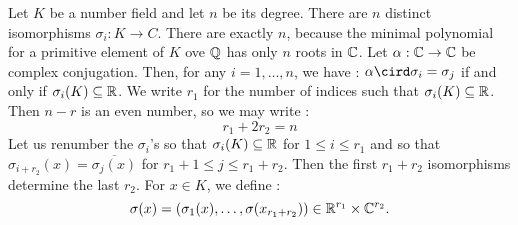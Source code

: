 Let $K$ be a number field and let $n$ be its degree. There are $n$ distinct isomorphisms $\sigma_i : K \to C$. There are exactly $n$, because the minimal polynomial for a primitive element of $K$ ove $\mathbb{Q}$ has only $n$ roots in $\mathbb{C}$. Let $\alpha : \mathbb{C} \to \mathbb{C}$ be complex conjugation. Then, for any $i = 1, \ldots, n$, we have : $\alpha \cird \sigma_i = \sigma_j$ if and only if $\sigma_i(K)\subseteq \mathbb{R}$. We write $r_1$ for the number of indices such that
$\sigma_i(K)\subseteq \mathbb{R}$. Then $n-r$ is an even number, so we may write :
\[r_1 + 2 r_2 = n\]
Let us renumber the $\sigma_i$'s so that $\sigma_i(K)\subseteq \mathbb{R}$ for $1\leq i\leq r_1$ and so that $\sigma_{i+r_2}(x)=\overline{\sigma_j(x)}$ for $r_1 + 1 \leq j \leq r_1 + r_2$. Then the first $r_1+r_2$ isomorphisms determine the last $r_2$. For $x\in K$, we define :
\[\sigma(x)=(\sigma_1(x), \ldots, \sigma(x_{r_1+r_2}))\in \mathbb{R}^{r_1}\times \mathbb{C}^{r_2}.\]
